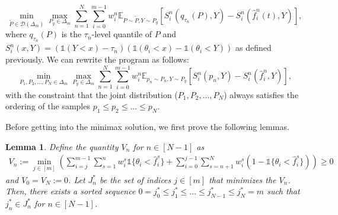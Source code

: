 \documentclass{article}
\newtheorem{lemma}{Lemma}
\newcommand{\one}{\mathds{1}}
\newcommand{\indi}[1]{\mathds{1}\{#1\}}
\newcommand{\E}{\mathbb{E}}
\newcommand{\cd}{\mathcal{D}}
\begin{document}
\[
\min_{\tilde{P} \in \cd(\Delta_m)} \max_{P_y \in \Delta_m} \sum_{n=1}^N \sum_{i=0}^{m-1} w_i^n \E_{P\sim \tilde{P}, Y \sim P_y}[S_i^n(q_{\tau_n}(P),Y) - S_i^n(\hat{f}_i^n(t),Y)],
\]
where $q_{\tau_n}(P)$ is the $\tau_n$-level quantile of $P$ and $S_i^n(x, Y) = (\one(Y < x)-\tau_n)(\one(\theta_i<x)-\one(\theta_i<Y))$ as defined previously. We can rewrite the program as follows:
\[
\min_{P_1, P_2, ..., P_N \in \Delta_m} \max_{P_y \in \Delta_m} \sum_{n=1}^N \sum_{i=0}^{m-1} w_i^n \E_{p_n \sim P_n
, Y \sim P_y}[S_i^n(p_n,Y) - S_i^n(\hat{f}_i^n,Y)],
\]
with the constraint that the joint distribution ($P_1, P_2, ..., P_N$) always satisfies the ordering of the samples $p_1 \leq p_2 \leq ... \leq p_N$.

Before getting into the minimax solution, we first prove the following lemmas.

\begin{lemma}\label{lem:jn_sort}
Define the quantity $V_n$ for $n \in [N-1]$ as
\begin{align} \label{eq:Vn_def}
V_n := \min_{j \in [m]} \left( \sum_{i=j}^{m-1} \sum_{s=1}^{n} w_i^s \indi{\theta_i < \hat{f}_i^s} + \sum_{i=0}^{j-1} \sum_{s=n+1}^{N}  w_i^s (1 - \indi{\theta_i < \hat{f}_i^s})\right) \geq 0
\end{align}
and $V_0 = V_N := 0$.
Let $J_n^*$ be the set of indices $j \in [m]$ that minimizes the $V_n$. 
\smallskip \\
Then, there exists a sorted sequence $0=j_0^* \leq j_1^* \leq ... \leq j_{N-1}^* \leq j_N^* = m$ such that $j_n^* \in J_n^*$ for $n \in [N-1]$.
\end{lemma}
\end{document}
